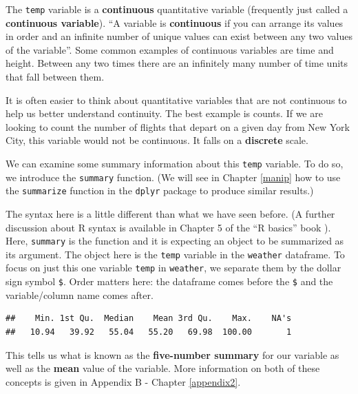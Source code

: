 \documentclass[]{tufte-book}
\newenvironment{Shaded}{\begin{snugshade}}{\end{snugshade}}
\newcommand{\KeywordTok}[1]{\textcolor[rgb]{0.13,0.29,0.53}{\textbf{{#1}}}}
\newcommand{\NormalTok}[1]{{#1}}
\begin{document}
The \texttt{temp} variable is a \textbf{continuous} quantitative
variable (frequently just called a \textbf{continuous variable}). ``A
variable is \textbf{continuous} if you can arrange its values in order
and an infinite number of unique values can exist between any two values
of the variable''\citep{rds2016}. Some common examples of continuous
variables are time and height. Between any two times there are an
infinitely many number of time units that fall between them.

It is often easier to think about quantitative variables that are not
continuous to help us better understand continuity. The best example is
counts. If we are looking to count the number of flights that depart on
a given day from New York City, this variable would not be continuous.
It falls on a \textbf{discrete} scale.

We can examine some summary information about this \texttt{temp}
variable. To do so, we introduce the \texttt{summary} function. (We will
see in Chapter \ref{manip} how to use the \texttt{summarize} function in
the \texttt{dplyr} package to produce similar results.)

The syntax here is a little different than what we have seen before. (A
further discussion about R syntax is available in Chapter 5 of the ``R
basics'' book \citep{usedtor2016}). Here, \texttt{summary} is the
function and it is expecting an object to be summarized as its argument.
The object here is the \texttt{temp} variable in the \texttt{weather}
dataframe. To focus on just this one variable \texttt{temp} in
\texttt{weather}, we separate them by the dollar sign symbol
\texttt{\$}. Order matters here: the dataframe comes before the
\texttt{\$} and the variable/column name comes after.

\begin{Shaded}
\end{Shaded}

\begin{verbatim}
##    Min. 1st Qu.  Median    Mean 3rd Qu.    Max.    NA's 
##   10.94   39.92   55.04   55.20   69.98  100.00       1
\end{verbatim}

This tells us what is known as the \textbf{five-number summary} for our
variable as well as the \textbf{mean} value of the variable. More
information on both of these concepts is given in Appendix B - Chapter
\ref{appendix2}.
\end{document}
